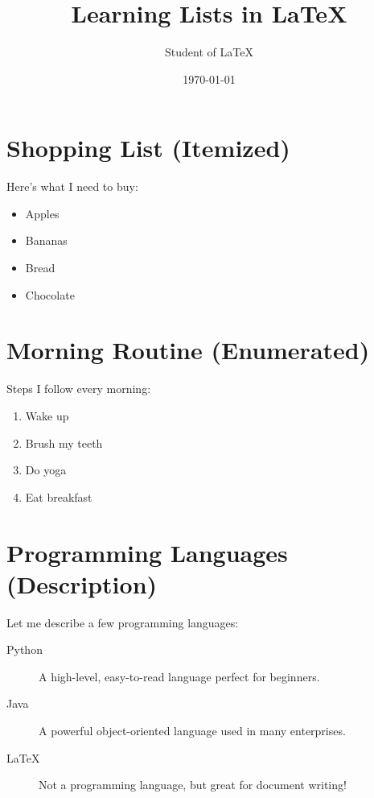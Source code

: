 \documentclass{article}
\title{Learning Lists in LaTeX}
\author{Student of LaTeX}
\date{\today}
\begin{document}
\maketitle

\section{Shopping List (Itemized)}
Here’s what I need to buy:

\begin{itemize}
  \item Apples
  \item Bananas
  \item Bread
  \item Chocolate
\end{itemize}

\section{Morning Routine (Enumerated)}
Steps I follow every morning:

\begin{enumerate}
  \item Wake up
  \item Brush my teeth
  \item Do yoga
  \item Eat breakfast
\end{enumerate}

\section{Programming Languages (Description)}
Let me describe a few programming languages:

\begin{description}
  \item[Python] A high-level, easy-to-read language perfect for beginners.
  \item[Java] A powerful object-oriented language used in many enterprises.
  \item[LaTeX] Not a programming language, but great for document writing!
\end{description}
\end{document}
